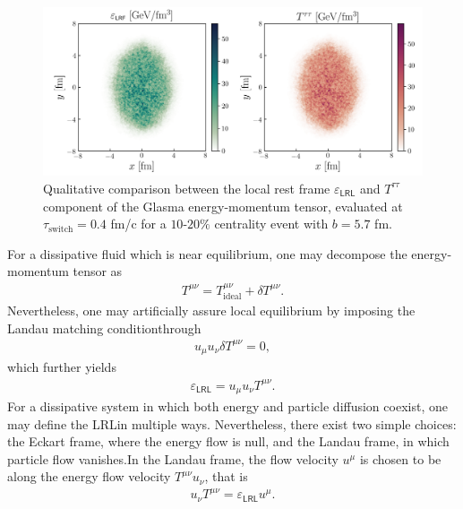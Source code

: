 \begin{figure}[h!]
	\includegraphics{images/ed_lrl_lab_auau_200_dpi_300.png}
	\caption{\normalsize Qualitative comparison between the local rest frame $\varepsilon_\textsf{LRL}$ and $T^{\tau\tau}$ component of the Glasma energy-momentum tensor, evaluated at $\tau_\mathrm{switch}=0.4$ fm/c for a $10$-$20\%$ centrality event with $b=5.7$ fm.}
\end{figure}

\begin{note}
For a dissipative fluid which is near equilibrium, one may decompose the energy-momentum tensor as
\begin{align*}
    T^{\mu\nu}=T^{\mu\nu}_\text{ideal}+\delta T^{\mu\nu}.
\end{align*}
Nevertheless, one may artificially assure local equilibrium by imposing the Landau matching conditionthrough
\begin{align*}
    u_\mu u_\nu \delta T^{\mu\nu}=0,
\end{align*}
which further yields
\begin{align*}
    \varepsilon_\textsf{LRL}=u_\mu u_\nu T^{\mu\nu}.
\end{align*}
For a dissipative system in which both energy and particle diffusion coexist, one may define the {\sffamily LRL}in multiple ways. Nevertheless, there exist two simple choices: the Eckart frame, where the energy flow is null, and the Landau frame, in which particle flow vanishes.In the Landau frame, the flow velocity $u^\mu$ is chosen to be along the energy flow velocity $T^{\mu\nu}u_\nu$, that is
\begin{align*}
    u_\nu T^{\mu\nu}=\varepsilon_\textsf{LRL}u^\mu.
\end{align*}
\end{note}

